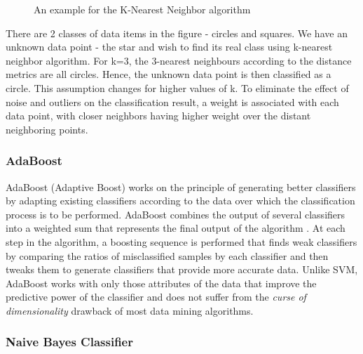 \documentclass[9pt,twocolumn,twoside]{../../styles/osajnl}
\begin{document}
{\begin{figure}[htbp]
\centering
{}
\caption{An example for the K-Nearest Neighbor algorithm \cite{www-knn-introduction}}
\label{fig: An example for the K-Nearest Neighbor algorithm}
\end{figure}

\noindent
There are 2 classes of data items in the figure - circles and
squares. We have an unknown data point - the star and wish to find its
real class using k-nearest neighbor algorithm. For k=3, the 3-nearest
neighbours according to the distance metrics are all circles. Hence,
the unknown data point is then classified as a circle. This assumption
changes for higher values of k. To eliminate the effect of noise and
outliers on the classification result, a weight is associated with
each data point, with closer neighbors having higher weight over the
distant neighboring points.

\subsubsection{AdaBoost}

AdaBoost (Adaptive Boost) works on the principle of generating better
classifiers by adapting existing classifiers according to the data
over which the classification process is to be performed. AdaBoost
combines the output of several classifiers into a weighted sum that
represents the final output of the algorithm
\cite{www-adaboost-wiki}. At each step in the algorithm, a boosting
sequence is performed that finds weak classifiers by comparing the
ratios of misclassified samples by each classifier and then tweaks
them to generate classifiers that provide more accurate data. Unlike
SVM, AdaBoost works with only those attributes of the data that
improve the predictive power of the classifier and does not suffer
from the \emph{curse of dimensionality}
\cite{www-curseofdimensionality-wiki} drawback of most data mining
algorithms.

\subsubsection{Naive Bayes Classifier}

}
\end{document}
